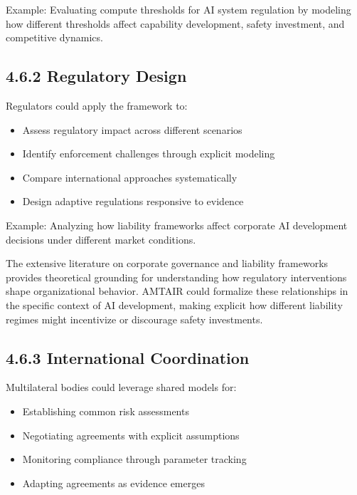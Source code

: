 \documentclass[
  11pt,
  letterpaper,
]{book}
\providecommand{\tightlist}{%
  \setlength{\itemsep}{0pt}\setlength{\parskip}{0pt}}
\begin{document}
Example: Evaluating compute thresholds for AI system regulation by
modeling how different thresholds affect capability development, safety
investment, and competitive dynamics.

\subsection{4.6.2 Regulatory Design}\label{sec-regulatory-integration}

Regulators could apply the framework to:

\begin{itemize}
\tightlist
\item
  Assess regulatory impact across different scenarios
\item
  Identify enforcement challenges through explicit modeling
\item
  Compare international approaches systematically
\item
  Design adaptive regulations responsive to evidence
\end{itemize}

Example: Analyzing how liability frameworks affect corporate AI
development decisions under different market conditions.

The extensive literature on corporate governance and liability
frameworks \textcite{cuomo2016} \textcite{demirag2000}
\textcite{devilliers2021} \textcite{divito2022} \textcite{kaur2024}
\textcite{list2011} \textcite{solomon2020} provides theoretical
grounding for understanding how regulatory interventions shape
organizational behavior. AMTAIR could formalize these relationships in
the specific context of AI development, making explicit how different
liability regimes might incentivize or discourage safety investments.

\subsection{4.6.3 International
Coordination}\label{sec-international-integration}

Multilateral bodies could leverage shared models for:

\begin{itemize}
\tightlist
\item
  Establishing common risk assessments
\item
  Negotiating agreements with explicit assumptions
\item
  Monitoring compliance through parameter tracking
\item
  Adapting agreements as evidence emerges
\end{itemize}
\end{document}
